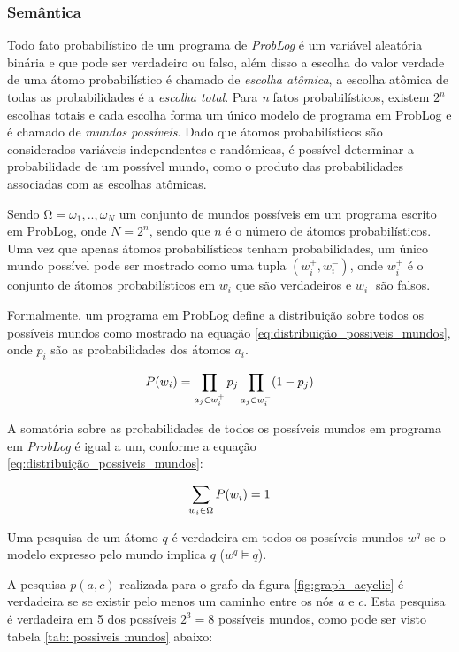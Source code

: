 \documentclass[
	12pt,				%
    oneside,			%
	a4paper,			%
	english,			%
	french,				%
	spanish,			%
	brazil,				%
	]{abntex2}
\begin{document}
\subsubsection{Semântica}

Todo fato probabilístico de um programa de \textit{ProbLog} é um variável aleatória binária e que pode ser verdadeiro ou falso, além disso a escolha do valor verdade de uma átomo probabilístico é chamado de \textit{escolha atômica}, a escolha atômica de todas as probabilidades é a \textit{escolha total}. Para \textit{n} fatos probabilísticos, existem $2^n$ escolhas totais e cada escolha forma um único modelo de programa em ProbLog e é chamado de \textit{mundos possíveis}. Dado que átomos probabilísticos são considerados variáveis independentes e randômicas, é possível determinar a probabilidade de um possível mundo, como o produto das probabilidades associadas com as escolhas atômicas. 

Sendo $Ω = {ω_1, .., ω_N }$ um conjunto de mundos possíveis em um programa escrito em ProbLog, onde $N=2^n$, sendo que $n$ é o número de átomos probabilísticos. Uma vez que apenas átomos probabilísticos tenham probabilidades, um  único mundo possível pode ser mostrado como uma tupla $(w_i^+, w_i^-)$, onde $w_i^+$ é o conjunto de átomos probabilísticos em $w_i$ que são verdadeiros e $w_i^-$ são falsos.

Formalmente, um programa em ProbLog define a distribuição sobre todos os possíveis mundos como mostrado na equação \ref{eq:distribuição_possiveis_mundos}, onde $p_i$ são as probabilidades dos átomos $a_i$.

\begin{equation}
\centering
    P(w_i)= \prod_{a_j\in w_i^+} p_j \prod_{a_j\in w_i^-} (1-p_j)
    \label{eq:distribuição_possiveis_mundos}
\end{equation}


A somatória sobre as probabilidades de todos os possíveis mundos em programa em \textit{ProbLog} é igual a um, conforme a equação \ref{eq:distribuição_possiveis_mundos}: 

\begin{equation}
\centering
    \sum_{w_i \in \Omega } {P(w_i)=1}
    \label{eq:distribuição_possiveis_mundos}
\end{equation}

Uma pesquisa de um átomo $q$ é verdadeira em todos os possíveis mundos $w^q$ se o modelo expresso pelo mundo implica $q$ ($w^q \models q$).

A pesquisa $p(a, c)$ realizada para o grafo da figura \ref{fig:graph_acyclic} é verdadeira se se existir pelo menos um caminho entre os nós $a$ e $c$. Esta pesquisa é verdadeira em 5 dos possíveis $2^3=8$ possíveis mundos, como pode ser visto tabela \ref{tab: possiveis mundos} abaixo:
\end{document}
